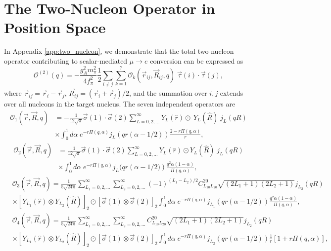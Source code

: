 \documentclass[12pt,letterpaper]{book}
\begin{document}
\section{The Two-Nucleon Operator in Position Space}
In Appendix \ref{app:two_nucleon}, we demonstrate that the total two-nucleon operator contributing to scalar-mediated $\mu\rightarrow e$ conversion can be expressed as 
\begin{equation}
\mathcal{O}^{(2)}(q)=-\frac{g_A^2m_{\pi}^2}{4f_{\pi}^2}\frac{1}{2}\sum_{i\neq j}\sum_{k=1}^7\mathcal{O}_k(\vec{r}_{ij},\vec{R}_{ij},q)\;\vec{\tau}(i)\cdot\vec{\tau}(j),
\end{equation}
where $\vec{r}_{ij}=\vec{r}_i-\vec{r}_j$, $\vec{R}_{ij}=(\vec{r}_i+\vec{r}_j)/2$, and the summation over $i,j$ extends over all nucleons in the target nucleus. The seven independent operators are
\begin{equation}
\begin{split}
\mathcal{O}_1(\vec{r},\vec{R},q)&=-\frac{1}{12\sqrt{\pi}}\vec{\sigma}(1)\cdot\vec{\sigma}(2)\sum_{L=0,2,...}^{\infty}Y_L(\hat{r})\odot\ Y_L(\hat{R})\;j_L(q R)\\
&\times\int_0^1d\alpha\;e^{-r\Pi(q,\alpha)}j_L\left(q r(\alpha-1/2)\right)\frac{2-r\Pi(q,\alpha)}{r},
\end{split}
\end{equation}
\begin{equation}
\begin{split}
\mathcal{O}_2(\vec{r},\vec{R},q)&=\frac{1}{12\sqrt{\pi}}\vec{\sigma}(1)\cdot\vec{\sigma}(2)\sum_{L=0,2,...}^{\infty}Y_L(\hat{r})\odot Y_L(\hat{R})\;j_L(q R)\\
&\times\int_0^1 d\alpha\;e^{-r\Pi(q,\alpha)}j_L(q r\left(\alpha-1/2)\right)\frac{q^2\alpha(1-\alpha)}{\Pi(q,\alpha)},
\end{split}
\end{equation}
\begin{equation}
\begin{split}
&\mathcal{O}_3(\vec{r},\vec{R},q)=\frac{1}{5\sqrt{24\pi}}\sum_{L_1=0,2,...}^{\infty}\sum_{L_2=0,2,...}^{\infty}(-1)^{(L_1-L_2)/2}C_{L_10L_20}^{20}\sqrt{(2L_1+1)(2L_2+1)}j_{L_2}(q R)\\
&\times\left[Y_{L_1}(\hat{r})\otimes Y_{L_2}(\hat{R})\right]_2\odot\left[\vec{\sigma}(1)\otimes\vec{\sigma}(2)\right]_2\int_0^1d\alpha\;e^{-r\Pi(q,\alpha)}j_{L_1}\left(q r(\alpha-1/2)\right)\frac{q^2\alpha(1-\alpha)}{\Pi(q,\alpha)},
\end{split}
\end{equation}
\begin{equation}
\begin{split}
&\mathcal{O}_4(\vec{r},\vec{R},q) = \frac{1}{5\sqrt{24\pi}}\sum_{L_1=0,2,...}^{\infty}\sum_{L_2=0,2,...}^{\infty}C_{L_10L_20}^{20}\sqrt{(2L_1+1)(2L_2+1)}j_{L_2}(q R)\\
&\times\left[Y_{L_1}(\hat{r})\otimes Y_{L_2}(\hat{R})\right]_2\odot\left[\vec{\sigma}(1)\otimes\vec{\sigma}(2)\right]_2\int_0^1 d\alpha\;e^{-r\Pi(q,\alpha)}j_{L_2}(q r(\alpha-1/2))\frac{1}{r}\left[1+r\Pi(q,\alpha)\right],
\end{split}
\end{equation}
\end{document}
